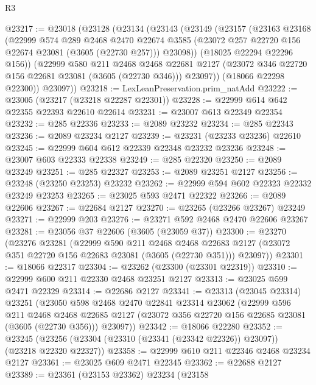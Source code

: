 \begin{lexlean}{R3}
\begin{coremodule}
@23217 := @23018
    (@23128
      (@23134
        (@23143
          (@23149
            (@23157
              (@23163
                @23168
                (@22999
                  @574
                  @289
                  @2468
                  @2470
                  @22674
                  @3585
                  (@23072 @257 @22720 @156 @22674 @23081 (@3605 (@22730 @257)))
                  @23098))
              (@18025 @22294 @22296 @156))
            (@22999
              @580
              @211
              @2468
              @2468
              @22681
              @2127
              (@23072 @346 @22720 @156 @22681 @23081 (@3605 (@22730 @346)))
              @23097))
          (@18066 @22298 @22300))
        @23097))
@23218 := LexLeanPreservation.prim_natAdd
@23222 := @23005 (@23217 (@23218 @22287 @22301))
@23228 := @22999 @614 @642 @22355 @22393 @22610 @22614
@23231 := @23007 @613 @22349 @22354
@23232 := @285 @22336
@23233 := @2089 @23232
@23234 := @285 @22343
@23236 := @2089 @23234 @2127
@23239 := @23231 (@23233 @23236) @22610
@23245 := @22999 @604 @612 @22339 @22348 @23232 @23236
@23248 := @23007 @603 @22333 @22338
@23249 := @285 @22320
@23250 := @2089 @23249
@23251 := @285 @22327
@23253 := @2089 @23251 @2127
@23256 := @23248 (@23250 @23253) @23232
@23262 := @22999 @594 @602 @22323 @22332 @23249 @23253
@23265 := @23025 @593 @2471 @22322
@23266 := @2089 @22606
@23267 := @22684 @2127
@23270 := @23265 (@23266 @23267) @23249
@23271 := @22999 @203
@23276 := @23271 @592 @2468 @2470 @22606 @23267
@23281 := @23056 @37 @22606 (@3605 (@23059 @37))
@23300 := @23270
    (@23276
      @23281
      (@22999
        @590
        @211
        @2468
        @2468
        @22683
        @2127
        (@23072 @351 @22720 @156 @22683 @23081 (@3605 (@22730 @351)))
        @23097))
@23301 := @18066 @22317
@23304 := @23262 (@23300 (@23301 @22319))
@23310 := @22999 @600 @211 @22330 @2468 @23251 @2127
@23313 := @23025 @599 @2471 @22329
@23314 := @22686 @2127
@23341 := @23313
    (@23045 @23314)
    @23251
    (@23050
      @598
      @2468
      @2470
      @22841
      @23314
      @23062
      (@22999
        @596
        @211
        @2468
        @2468
        @22685
        @2127
        (@23072 @356 @22720 @156 @22685 @23081 (@3605 (@22730 @356)))
        @23097))
@23342 := @18066 @22280
@23352 := @23245 (@23256 (@23304 (@23310 (@23341 (@23342 @22326)) @23097)) (@23218 @22320 @22327))
@23358 := @22999 @610 @211 @22346 @2468 @23234 @2127
@23361 := @23025 @609 @2471 @22345
@23362 := @22688 @2127
@23389 := @23361
    (@23153 @23362)
    @23234
    (@23158

\end{coremodule}
\end{lexlean}
